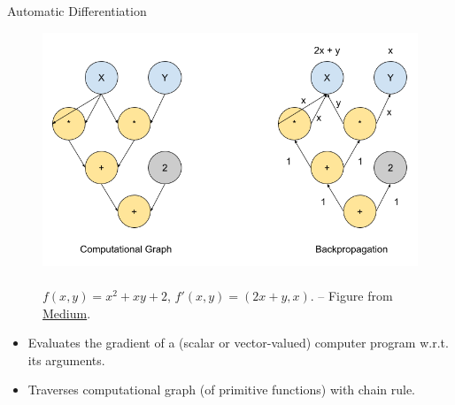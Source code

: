 \documentclass{beamer}
\begin{document}
\begin{frame}{Automatic Differentiation}

    \begin{figure}
        \begin{minipage}[c]{0.7\textwidth}
            \includegraphics[scale=0.3]{imgs/autograd.png}
        \end{minipage}
        \begin{minipage}[l]{0.27\textwidth}
            \caption{
            \\$f(x,y) = x^2+xy+2$, $f'(x,y) = (2x+y,x).$
            -- Figure from \href{https://avinashselvam.medium.com/automatic-differentiation-explained-9f02c74e9a90}{Medium}.}
        \end{minipage}
        \label{fig:autograd-illustration}
    \end{figure}
    
    \begin{itemize}
        \item Evaluates the gradient of a (scalar or vector-valued) computer program w.r.t. its arguments.
        \item \pause Traverses computational graph (of primitive functions) with chain rule.
    \end{itemize}
    
\end{frame}
\end{document}

